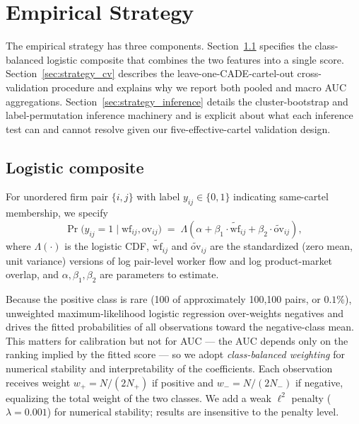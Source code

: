 \section{Empirical Strategy}\label{sec:strategy}

The empirical strategy has three components. Section~\ref{sec:strategy_logit} specifies the class-balanced logistic composite that combines the two features into a single score. Section~\ref{sec:strategy_cv} describes the leave-one-CADE-cartel-out cross-validation procedure and explains why we report both pooled and macro AUC aggregations. Section~\ref{sec:strategy_inference} details the cluster-bootstrap and label-permutation inference machinery and is explicit about what each inference test can and cannot resolve given our five-effective-cartel validation design.

\subsection{Logistic composite}\label{sec:strategy_logit}

For unordered firm pair $\{i, j\}$ with label $y_{ij} \in \{0, 1\}$ indicating same-cartel membership, we specify
\begin{equation}\label{eq:logit}
\Pr\bigl(y_{ij} = 1 \mid \mathrm{wf}_{ij}, \mathrm{ov}_{ij}\bigr)
\;=\; \Lambda\!\left(\alpha + \beta_1 \cdot \widetilde{\mathrm{wf}}_{ij} + \beta_2 \cdot \widetilde{\mathrm{ov}}_{ij}\right),
\end{equation}
where $\Lambda(\cdot)$ is the logistic CDF, $\widetilde{\mathrm{wf}}_{ij}$ and $\widetilde{\mathrm{ov}}_{ij}$ are the standardized (zero mean, unit variance) versions of log pair-level worker flow and log product-market overlap, and $\alpha, \beta_1, \beta_2$ are parameters to estimate.

Because the positive class is rare (100 of approximately 100{,}100 pairs, or $0.1\%$), unweighted maximum-likelihood logistic regression over-weights negatives and drives the fitted probabilities of all observations toward the negative-class mean. This matters for calibration but not for AUC --- the AUC depends only on the ranking implied by the fitted score --- so we adopt \emph{class-balanced weighting} for numerical stability and interpretability of the coefficients. Each observation receives weight $w_{+} = N/(2N_{+})$ if positive and $w_{-} = N/(2N_{-})$ if negative, equalizing the total weight of the two classes. We add a weak $\ell^2$ penalty ($\lambda = 0.001$) for numerical stability; results are insensitive to the penalty level.

